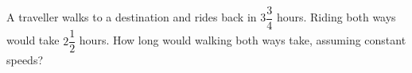 A traveller walks to a destination and rides back in $3\dfrac{3}{4}$ hours. Riding both ways would take $2\dfrac{1}{2}$ hours. How long would walking both ways take, assuming constant speeds?
